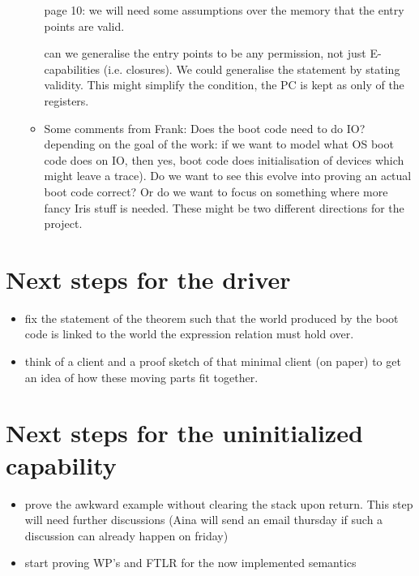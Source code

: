 \documentclass[a4paper, 10pt]{article}
\begin{document}
\begin{itemize}
\begin{itemize}
page 10: we will need some assumptions over the memory that the entry points are valid. 

can we generalise the entry points to be any permission, not just E-capabilities (i.e. closures). We could generalise the statement by stating validity. This might simplify the condition, the PC is kept as only of the registers. 

\item Some comments from Frank: Does the boot code need to do IO? depending on the goal of the work: if we want to model what OS boot code does on IO, then yes, boot code does initialisation of devices which might leave a trace). Do we want to see this evolve into proving an actual boot code correct? Or do we want to focus on something where more fancy Iris stuff is needed. These might be two different directions for the project. 
\end{itemize}

\end{itemize}


\section{Next steps for the driver}

\begin{itemize}
	\item fix the statement of the theorem such that the world produced by the boot code is linked to the world the expression relation must hold over. 
	\item think of a client and a proof sketch of that minimal client (on paper) to get an idea of how these moving parts fit together.
\end{itemize}

\section{Next steps for the uninitialized capability}

\begin{itemize}
	\item prove the awkward example without clearing the stack upon return. This step will need further discussions (Aina will send an email thursday if such a discussion can already happen on friday)
	\item start proving WP's and FTLR for the now implemented semantics 
\end{itemize}
\end{document}
